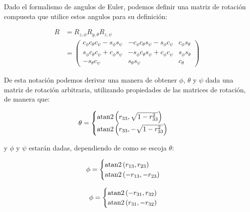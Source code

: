 \begin{multicols*}{3}
            Dado el formalismo de angulos de Euler, podemos definir una matriz de rotación compuesta que utilice estos angulos para su definición:

            \begin{align}
                R &= R_{z, \phi} R_{y, \theta} R_{z, \psi} \nonumber \\
                &=
                \begin{pmatrix}
                    c_{\phi} c_{\theta} c_{\psi} - s_{\phi} s_{\psi} & - c_{\phi} c_{\theta} s_{\psi} - s_{\phi} c_{\psi} & c_{\phi} s_{\theta} \\
                    s_{\phi} c_{\theta} c_{\psi} + c_{\phi} s_{\psi} & - s_{\phi} c_{\theta} s_{\psi} + c_{\phi} c_{\psi} & s_{\phi} s_{\theta} \\
                    - s_{\theta} c_{\psi} & s_{\theta} s_{\psi} & c_{\theta}
                \end{pmatrix}
            \end{align}

            De esta notación podemos derivar una manera de obtener $\phi$, $\theta$ y $\psi$ dada una matriz de rotación arbitraria, utilizando propiedades de las matrices de rotación, de manera que:

            \begin{equation}
                \theta =
                \begin{cases}
                    \operatorname{atan2}{\left( r_{33}, \sqrt{1 - r_{33}^2} \right)} \\
                    \operatorname{atan2}{\left( r_{33}, -\sqrt{1 - r_{33}^2} \right)}
                \end{cases}
            \end{equation}

            y $\phi$ y $\psi$ estarán dadas, dependiendo de como se escoja $\theta$:

            \begin{equation}
                \phi =
                \begin{cases}
                    \operatorname{atan2}{(r_{13}, r_{23})} \\
                    \operatorname{atan2}{(-r_{13}, -r_{23})}
                \end{cases}
            \end{equation}

            \begin{equation}
                \phi =
                \begin{cases}
                    \operatorname{atan2}{(-r_{31}, r_{32})} \\
                    \operatorname{atan2}{(r_{31}, -r_{32})}
                \end{cases}
            \end{equation}


\end{multicols*}
